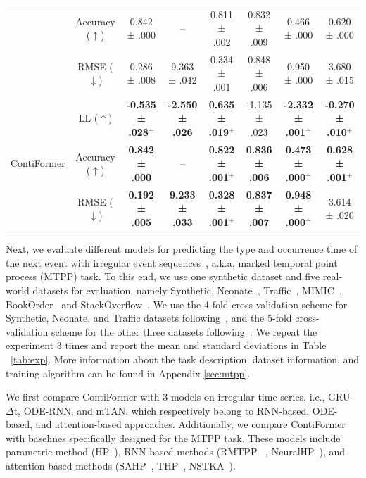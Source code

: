 \documentclass{article}
\begin{document}
\begin{table}[t]
{\begin{tabular}{cccccccc}
        ~ & Accuracy ($\uparrow$) & 0.842 ± .000 & -- & 0.811 ± .002 & 0.832 ± .009 & 0.466 ± .000 & 0.620 ± .000 \\ 
        ~ & RMSE ($\downarrow$) & 0.286 ± .008 & 9.363 ± .042 & 0.334 ± .001 & 0.848 ± .006 & 0.950 ± .000 & 3.680 ± .015 \\
    \midrule
        \multirow{3}{*}{ContiFormer} & LL ($\uparrow$) & \textbf{-0.535 ± .028$^+$} & \textbf{-2.550 ± .026} & \textbf{0.635 ± .019$^+$} & -1.135 ± .023 & \textbf{-2.332 ± .001$^+$} & \textbf{-0.270 ± .010$^+$} \\ 
        ~ & Accuracy ($\uparrow$) & \textbf{0.842 ± .000} & -- & \textbf{0.822 ± .001$^+$} & \textbf{0.836 ± .006} & \textbf{0.473 ± .000$^+$} & \textbf{0.628 ± .001$^+$} \\ 
        ~ & RMSE ($\downarrow$) & \textbf{0.192 ± .005} & \textbf{9.233 ± .033} & \textbf{0.328 ± .001$^+$} & \textbf{0.837 ± .007} & \textbf{0.948 ± .000$^+$} & 3.614 ± .020 \\ 
    \bottomrule
    \end{tabular}}
\end{table}


Next, we evaluate different models for predicting the type and occurrence time of the next event with irregular event sequences~\cite{shchur2019intensity, shchur2020fast, chen2021learning, gupta2022proactive}, a.k.a, marked temporal point process (MTPP) task.
To this end, we use one synthetic dataset and five real-world datasets for evaluation, namely Synthetic, Neonate~\cite{stevenson2019dataset}, Traffic~\cite{lai2018modeling},
MIMIC~\cite{du2016recurrent}, BookOrder~\cite{du2016recurrent} and StackOverflow~\cite{leskovec2014snap}. 
We use the 4-fold cross-validation scheme for Synthetic, Neonate, and Traffic datasets following~\cite{fang2023learning}, and the 5-fold cross-validation scheme for the other three datasets following~\cite{mei2017neural, zuo2020transformer}.
We repeat the experiment 3 times and report the mean and standard deviations in Table ~\ref{tab:exp}. More information about the task description, dataset information, and training algorithm can be found in Appendix \ref{sec:mtpp}.

We first compare ContiFormer with 3 models on irregular time series, i.e., GRU-$\Delta$t, ODE-RNN, and mTAN, which respectively belong to RNN-based, ODE-based, and attention-based approaches. 
Additionally, we compare ContiFormer with baselines specifically designed for the MTPP task. These models include parametric method (HP~\cite{hawkes1971spectra}), RNN-based methods (RMTPP ~\cite{du2016recurrent}, NeuralHP~\cite{mei2017neural}), and attention-based methods (SAHP~\cite{zhang2020self}, THP~\cite{zuo2020transformer}, NSTKA~\cite{ma2022non}). 
\end{document}
